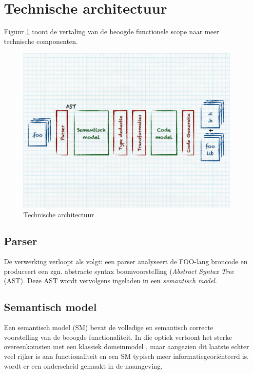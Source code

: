 \section{Technische architectuur}
\label{section:arch-technical}

Figuur \ref{fig:arch-technical} toont de vertaling van de beoogde functionele
scope naar meer technische componenten. 

\begin{figure}[ht]
  \centering
  \includegraphics[width=0.9\linewidth]{resources/arch-technical.pdf}
  \caption{Technische architectuur}
  \label{fig:arch-technical}
\end{figure}

\subsection{Parser}

De verwerking verloopt als volgt: een parser analyseert de FOO-lang broncode en
produceert een zgn. abstracte syntax boomvoorstelling (\emph{Abstract Syntax
Tree} (AST). Deze AST wordt vervolgens ingeladen in een \emph{semantisch model}.

\subsection{Semantisch model}
\label{subsection:arch-semantic-model}

Een semantisch model (SM) \citep{fowler2010domain} bevat de volledige en
semantisch correcte voorstelling van de beoogde functionaliteit. In die optiek
vertoont het sterke overeenkomsten met een klassiek domeinmodel
\citep{fowler2010domain}, maar aangezien dit laatste echter veel rijker is aan
functionaliteit en een SM typisch meer informatiegeori\"enteerd is, wordt er
een onderscheid gemaakt in de naamgeving.

